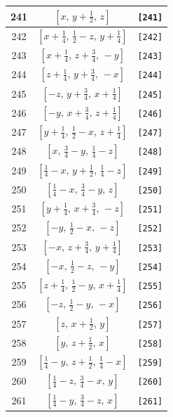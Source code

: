 \documentclass[fleqn,8pt]{jsarticle}
\begin{document}
\begin{longtable}{ccc}
241 & $\left[ x,\, y + \frac{1}{2},\, z \right]$ & {\tt [241]} \\ \hline
242 & $\left[ x + \frac{1}{4},\, \frac{1}{2} - z,\, y + \frac{1}{4} \right]$ & {\tt [242]} \\ \hline
243 & $\left[ x + \frac{1}{4},\, z + \frac{3}{4},\, - y \right]$ & {\tt [243]} \\ \hline
244 & $\left[ z + \frac{1}{4},\, y + \frac{3}{4},\, - x \right]$ & {\tt [244]} \\ \hline
245 & $\left[ - z,\, y + \frac{3}{4},\, x + \frac{1}{4} \right]$ & {\tt [245]} \\ \hline
246 & $\left[ - y,\, x + \frac{3}{4},\, z + \frac{1}{4} \right]$ & {\tt [246]} \\ \hline
247 & $\left[ y + \frac{1}{4},\, \frac{1}{2} - x,\, z + \frac{1}{4} \right]$ & {\tt [247]} \\ \hline
248 & $\left[ x,\, \frac{3}{4} - y,\, \frac{1}{4} - z \right]$ & {\tt [248]} \\ \hline
249 & $\left[ \frac{1}{4} - x,\, y + \frac{1}{2},\, \frac{1}{4} - z \right]$ & {\tt [249]} \\ \hline
250 & $\left[ \frac{1}{4} - x,\, \frac{3}{4} - y,\, z \right]$ & {\tt [250]} \\ \hline
251 & $\left[ y + \frac{1}{4},\, x + \frac{3}{4},\, - z \right]$ & {\tt [251]} \\ \hline
252 & $\left[ - y,\, \frac{1}{2} - x,\, - z \right]$ & {\tt [252]} \\ \hline
253 & $\left[ - x,\, z + \frac{3}{4},\, y + \frac{1}{4} \right]$ & {\tt [253]} \\ \hline
254 & $\left[ - x,\, \frac{1}{2} - z,\, - y \right]$ & {\tt [254]} \\ \hline
255 & $\left[ z + \frac{1}{4},\, \frac{1}{2} - y,\, x + \frac{1}{4} \right]$ & {\tt [255]} \\ \hline
256 & $\left[ - z,\, \frac{1}{2} - y,\, - x \right]$ & {\tt [256]} \\ \hline
257 & $\left[ z,\, x + \frac{1}{2},\, y \right]$ & {\tt [257]} \\ \hline
258 & $\left[ y,\, z + \frac{1}{2},\, x \right]$ & {\tt [258]} \\ \hline
259 & $\left[ \frac{1}{4} - y,\, z + \frac{1}{2},\, \frac{1}{4} - x \right]$ & {\tt [259]} \\ \hline
260 & $\left[ \frac{1}{4} - z,\, \frac{3}{4} - x,\, y \right]$ & {\tt [260]} \\ \hline
261 & $\left[ \frac{1}{4} - y,\, \frac{3}{4} - z,\, x \right]$ & {\tt [261]} \\ \hline

\end{longtable}
\end{document}
